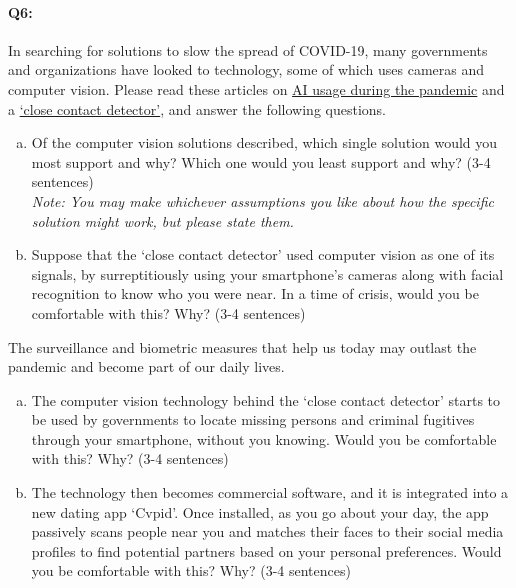 
\pagebreak
\paragraph{Q6:}
In searching for solutions to slow the spread of COVID-19, many governments and organizations have looked to technology, some of which uses cameras and computer vision. Please read these articles on
\href{https://thenextweb.com/neural/2020/03/21/why-ai-might-be-the-most-effective-weapon-we-have-to-fight-covid-19/}{AI usage during the pandemic} and a \href{https://www.bbc.com/news/technology-51439401}{‘close contact detector’}, and answer the following questions.
\begin{enumerate}[(a)]

    \item
    Of the computer vision solutions described, which single solution would you most support and why?
    Which one would you least support and why? (3-4 sentences) \\
    \emph{Note: You may make whichever assumptions you like about how the specific solution might work, but please state them.}

    \item
    Suppose that the `close contact detector' used computer vision as one of its signals, by surreptitiously using your smartphone's cameras along with facial recognition to know who you were near. In a time of crisis, would you be comfortable with this? Why? (3-4 sentences)
\end{enumerate}

The surveillance and biometric measures that help us today may outlast the pandemic and become part of our daily lives.
\begin{enumerate}[(c)]
    \item
    The computer vision technology behind the `close contact detector' starts to be used by governments to locate missing persons and criminal fugitives through your smartphone, without you knowing. Would you be comfortable with this? Why? (3-4 sentences)

    \item
    The technology then becomes commercial software, and it is integrated into a new dating app `Cvpid'. Once installed, as you go about your day, the app passively scans people near you and matches their faces to their social media profiles to find potential partners based on your personal preferences. Would you be comfortable with this? Why? (3-4 sentences)

\end{enumerate}


